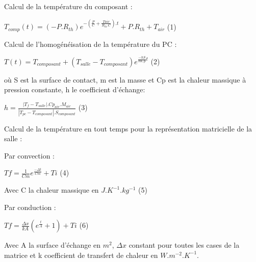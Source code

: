 \documentclass{article}
\begin{document}
\begin{flushleft}
\begin{Large}
Calcul de la temp\'erature du composant :
\par\leavevmode\par
$T_{comp}(t)= (-P.R_{th})e^{-(\frac{P}{C}+\frac{Tair}{R_{th}.C}).t}+P.R_{th}+T_{air}$ (1)
\par\leavevmode\par

Calcul de l'homog\'en\'eisation de la temp\'erature du PC :
\par\leavevmode\par

$T(t) = T_{composant} + (T_{salle} - T_{composant})e^{\frac{-hS}{mCp}t}$ (2)
\\
\par\leavevmode\par
o\`u S est la surface de contact, m est la masse et Cp est la chaleur massique \`a pression constante, h le coefficient d'\'echange:
\\
\par\leavevmode\par
$h =  \frac{|T_{f} - T_{salle}|  . Cp_{air} . M_{air}}{|T_{pc}-T_{composant}|.S_{composant}} $ (3)

\par\leavevmode\par
\par\leavevmode\par
Calcul de la temp\'erature en tout temps pour la repr\'esentation matricielle de la salle :
\par\leavevmode\par
Par convection :
\par\leavevmode\par

$Tf = \frac{1}{Cm}e^{\frac{-\Delta t}{Cm}}+Ti$ (4)
\par\leavevmode\par

Avec C la chaleur massique en $J.K^{-1}.kg^{-1}$ (5)
\par\leavevmode\par
Par conduction :
\par\leavevmode\par
$Tf = \frac{\Delta x}{kA}(e^{\frac{t}{A}}+1)+Ti$ (6)
\par\leavevmode\par

Avec A la surface d'\'echange en $m^{2}$, $\Delta x$ constant pour toutes les cases de la matrice et k coefficient de transfert de chaleur en $W.m^{-2}.K^{-1}$.




\end{Large}
\end{flushleft}
\end{document}
